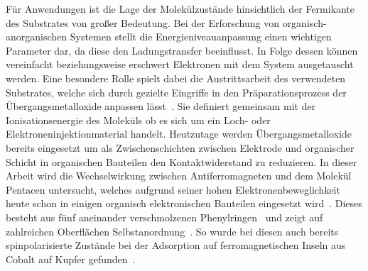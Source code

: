     Für Anwendungen ist die Lage der Molekülzustände hinsichtlich der Fermikante des Substrates von großer Bedeutung.
    Bei der Erforschung von organisch-anorganischen Systemen stellt die Energieniveauanpassung einen wichtigen Parameter dar, da diese den Ladungstransfer beeinflusst.
    In Folge dessen können vereinfacht beziehungsweise erschwert Elektronen mit dem System ausgetauscht werden.
    Eine besondere Rolle spielt dabei die Austrittsarbeit des verwendeten Substrates, welche sich durch gezielte Eingriffe in den Präparationsprozess der Übergangsmetalloxide anpassen lässt~\cite{5A_4, 5A_3, IF_11}.
    Sie definiert gemeinsam mit der Ionisationsenergie des Moleküls ob es sich um ein Loch- oder Elektroneninjektionmaterial handelt.
    Heutzutage werden Übergangsmetalloxide bereits eingesetzt um als Zwischenschichten zwischen Elektrode und organischer Schicht in organischen Bauteilen den Kontaktwiderstand zu reduzieren.
    In dieser Arbeit wird die Wechselwirkung zwischen Antiferromagneten und dem Molekül Pentacen untersucht, welches aufgrund seiner hohen Elektronenbeweglichkeit heute schon in einigen organisch elektronischen Bauteilen eingesetzt wird~\cite{5A_4, 5A_13}.
    Dieses besteht aus fünf aneinander verschmolzenen Phenylringen~\cite{MM_2} und zeigt auf zahlreichen Oberflächen Selbstanordnung~\cite{5A_9}.
    So wurde bei diesen auch bereits spinpolarisierte Zustände bei der Adsorption auf ferromagnetischen Inseln aus Cobalt auf Kupfer gefunden~\cite{chu_spin-dependent_2015}.

